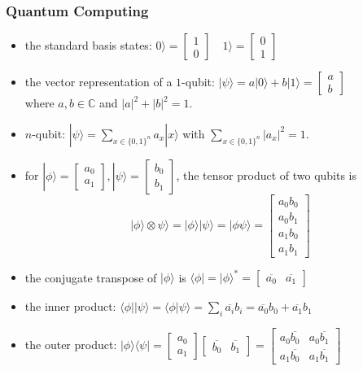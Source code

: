 \documentclass[UTF8,aspectratio=43,11pt,colorlinks,compress,openany]{beamer}%
\begin{document}
\begin{frame}\frametitle{Quantum Computing}
\setlength\abovedisplayskip{0pt}
\setlength\belowdisplayskip{0pt}
	\begin{itemize}
		\item the standard basis states: $0\rangle=
		\begin{bmatrix}
			1\\
			0
		\end{bmatrix}\quad 1\rangle=
		\begin{bmatrix}
			0\\
			1
		\end{bmatrix}$
		\item the vector representation of a $1$-qubit: $|\psi\rangle = a|0\rangle +b|1\rangle = \begin{bmatrix}a\\b\end{bmatrix}$\\
		where $a,b\in\mathbb{C}$ and $|a|^2+|b|^2=1$.
		\item $n$-qubit: $|\psi\rangle = \sum\limits_{x\in\{0,1\}^n}a_x|x\rangle$ with $\sum\limits_{x\in\{0,1\}^n}|a_x|^2=1$.
		\item for $|\phi\rangle = \begin{bmatrix}a_0\\a_1\end{bmatrix}, |\psi\rangle = \begin{bmatrix}b_0\\b_1\end{bmatrix}$, the tensor product of two qubits is
		\[|\phi\rangle\otimes \psi\rangle=|\phi\rangle|\psi\rangle=|\phi\psi\rangle=\begin{bmatrix}
			a_0b_0\\
			a_0b_1\\
			a_1b_0\\
			a_1b_1
		\end{bmatrix}\]
		\item the conjugate transpose of $|\phi\rangle$ is $\langle \phi|=|\phi\rangle^*=\begin{bmatrix}
			\overline{a_0} &\overline{a_1}
		\end{bmatrix}$
		\item the inner product: $\langle \phi||\psi\rangle=\langle \phi|\psi\rangle=\sum_i\overline{a_i}b_i=\overline{a_0}b_0+\overline{a_1}b_1$
		\item the outer product: $|\phi\rangle\langle \psi|=
		\begin{bmatrix}
			a_0\\
			a_1
		\end{bmatrix}
		\begin{bmatrix}
			\overline{b_0} &\overline{b_1}
		\end{bmatrix}=
		\begin{bmatrix}
			a_0\overline{b_0} &a_0\overline{b_1}\\
			a_1\overline{b_0} &a_1\overline{b_1}
		\end{bmatrix}$
	\end{itemize}
\end{frame}
\end{document}
